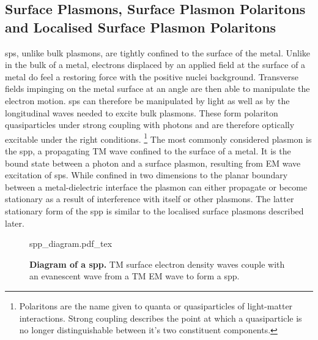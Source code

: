 \documentclass{article}
\begin{document}
\subsection{Surface Plasmons, Surface Plasmon Polaritons and Localised Surface Plasmon Polaritons}

\Glspl{sp}, unlike bulk plasmons, are tightly confined to the surface of the metal.
Unlike in the bulk of a metal, electrons displaced by an applied field at the surface of a metal do feel a restoring force with the positive nuclei background. Transverse fields impinging on the metal surface at an angle are then able to manipulate the electron motion. \Glspl{sp} can therefore be manipulated by light as well as by the longitudinal waves needed to excite bulk plasmons.
These form polariton quasiparticles under strong coupling with photons and are therefore optically excitable under the right conditions.%
\footnote{Polaritons are the name given to quanta or quasiparticles of light-matter interactions. Strong coupling describes the point at which a quasiparticle is no longer distinguishable between it's two constituent components.}
The most commonly considered plasmon is the \gls{spp}, a propagating TM wave confined to the surface of a metal. It is the bound state between a photon and a surface plasmon{\color{red}, resulting from EM wave excitation of \glspl{sp}}. While confined in two dimensions to the planar boundary between a metal-dielectric interface the plasmon can either propagate or become stationary as a result of interference {\color{red}with itself or other plasmons}. The latter stationary form of the \gls{spp} is similar to the localised surface plasmons described later.

\begin{figure}[bt]
\fontsize{10pt}{1em}\selectfont
\def\svgwidth{0.6\textwidth}
{spp_diagram.pdf_tex}
\caption[Diagram of a \acrfull{spp}]{\textbf{Diagram of a \acrfull{spp}.} TM surface electron density waves couple with an evanescent wave from a TM EM wave to form a \gls{spp}.}
\label{fig:spp_diagram}
\end{figure}
\end{document}
